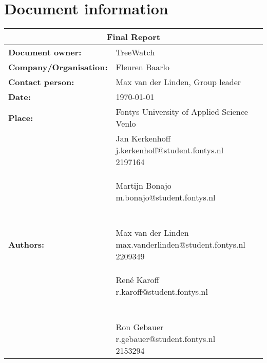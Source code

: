 \section*{Document information}
	\begin{tabular}{ll}
		\multicolumn{2}{c}{\textbf{Final Report}} \\ \hline
		\textbf{Document owner:} & TreeWatch \\
		\textbf{Company/Organisation:} & Fleuren Baarlo \\
		\textbf{Contact person:} & Max van der Linden, Group leader \\
		\textbf{Date:} & \today \\
		\textbf{Place:} & Fontys University of Applied Science Venlo \\
		\textbf{Authors:} & \parbox[t]{5cm}{
		Jan Kerkenhoff\\ j.kerkenhoff@student.fontys.nl\\ 2197164 \\\\
		Martijn Bonajo\\ m.bonajo@student.fontys.nl\\ \\\\
		Max van der Linden\\ max.vanderlinden@student.fontys.nl\\ 2209349 \\\\
		René Karoff\\ r.karoff@student.fontys.nl\\ \\\\
		Ron Gebauer\\ r.gebauer@student.fontys.nl\\ 2153294 \\ }
	\end{tabular}